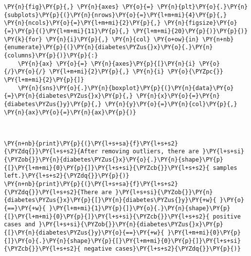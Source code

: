     \begin{tcolorbox}[breakable, size=fbox, boxrule=1pt, pad at break*=1mm,colback=cellbackground, colframe=cellborder]
\begin{Verbatim}[commandchars=\\\{\}]
\PY{n}{fig}\PY{p}{,} \PY{n}{axes} \PY{o}{=} \PY{n}{plt}\PY{o}{.}\PY{n}{subplots}\PY{p}{(}\PY{n}{nrows}\PY{o}{=}\PY{l+m+mi}{4}\PY{p}{,} \PY{n}{ncols}\PY{o}{=}\PY{l+m+mi}{2}\PY{p}{,} \PY{n}{figsize}\PY{o}{=}\PY{p}{(}\PY{l+m+mi}{11}\PY{p}{,} \PY{l+m+mi}{20}\PY{p}{)}\PY{p}{)}
\PY{k}{for} \PY{n}{i}\PY{p}{,} \PY{n}{col} \PY{o+ow}{in} \PY{n+nb}{enumerate}\PY{p}{(}\PY{n}{diabetes\PYZus{}x}\PY{o}{.}\PY{n}{columns}\PY{p}{)}\PY{p}{:}
    \PY{n}{ax} \PY{o}{=} \PY{n}{axes}\PY{p}{[}\PY{n}{i} \PY{o}{/}\PY{o}{/} \PY{l+m+mi}{2}\PY{p}{,} \PY{n}{i} \PY{o}{\PYZpc{}} \PY{l+m+mi}{2}\PY{p}{]}
    \PY{n}{sns}\PY{o}{.}\PY{n}{boxplot}\PY{p}{(}\PY{n}{data}\PY{o}{=}\PY{n}{diabetes\PYZus{}x}\PY{p}{,} \PY{n}{x}\PY{o}{=}\PY{n}{diabetes\PYZus{}y}\PY{p}{,} \PY{n}{y}\PY{o}{=}\PY{n}{col}\PY{p}{,} \PY{n}{ax}\PY{o}{=}\PY{n}{ax}\PY{p}{)}
\end{Verbatim}
\end{tcolorbox}

    \begin{center}
    \end{center}
    { \hspace*{\fill} \\}
    
    \begin{tcolorbox}[breakable, size=fbox, boxrule=1pt, pad at break*=1mm,colback=cellbackground, colframe=cellborder]
\begin{Verbatim}[commandchars=\\\{\}]
\PY{n+nb}{print}\PY{p}{(}\PY{l+s+sa}{f}\PY{l+s+s2}{\PYZdq{}}\PY{l+s+s2}{After removing outliers, there are }\PY{l+s+si}{\PYZob{}}\PY{n}{diabetes\PYZus{}x}\PY{o}{.}\PY{n}{shape}\PY{p}{[}\PY{l+m+mi}{0}\PY{p}{]}\PY{l+s+si}{\PYZcb{}}\PY{l+s+s2}{ samples left.}\PY{l+s+s2}{\PYZdq{}}\PY{p}{)}
\PY{n+nb}{print}\PY{p}{(}\PY{l+s+sa}{f}\PY{l+s+s2}{\PYZdq{}}\PY{l+s+s2}{There are }\PY{l+s+si}{\PYZob{}}\PY{n}{diabetes\PYZus{}x}\PY{p}{[}\PY{n}{diabetes\PYZus{}y}\PY{+w}{ }\PY{o}{==}\PY{+w}{ }\PY{l+m+mi}{1}\PY{p}{]}\PY{o}{.}\PY{n}{shape}\PY{p}{[}\PY{l+m+mi}{0}\PY{p}{]}\PY{l+s+si}{\PYZcb{}}\PY{l+s+s2}{ positive cases and }\PY{l+s+si}{\PYZob{}}\PY{n}{diabetes\PYZus{}x}\PY{p}{[}\PY{n}{diabetes\PYZus{}y}\PY{o}{==}\PY{+w}{ }\PY{l+m+mi}{0}\PY{p}{]}\PY{o}{.}\PY{n}{shape}\PY{p}{[}\PY{l+m+mi}{0}\PY{p}{]}\PY{l+s+si}{\PYZcb{}}\PY{l+s+s2}{ negative cases}\PY{l+s+s2}{\PYZdq{}}\PY{p}{)}
\end{Verbatim}
\end{tcolorbox}

